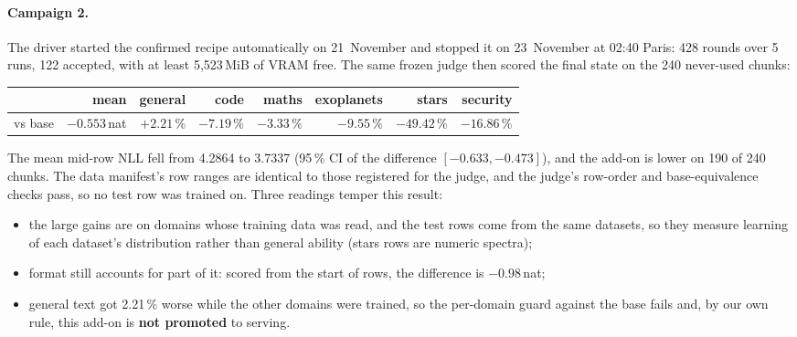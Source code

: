 \documentclass[11pt,a4paper]{article}
\begin{document}
\paragraph{Campaign 2.} The driver started the confirmed recipe automatically on 21~November and stopped it on
23~November at 02:40 Paris: 428 rounds over 5 runs, 122 accepted, with at least 5{,}523\,MiB of VRAM free. The same
frozen judge then scored the final state on the 240 never-used chunks:
\begin{center}\small
\begin{tabular}{@{}lrrrrrrr@{}}
\toprule
 & mean & general & code & maths & exoplanets & stars & security\\
\midrule
vs base & $-0.553$\,nat & $+2.21\,\%$ & $-7.19\,\%$ & $-3.33\,\%$ & $-9.55\,\%$ & $-49.42\,\%$ & $-16.86\,\%$\\
\bottomrule
\end{tabular}
\end{center}
The mean mid-row NLL fell from 4.2864 to 3.7337 (95\,\% CI of the difference $[-0.633,-0.473]$), and the add-on is
lower on 190 of 240 chunks. The data manifest's row ranges are identical to those registered for the judge, and the
judge's row-order and base-equivalence checks pass, so no test row was trained on. Three readings temper this result:
\begin{itemize}[leftmargin=*,itemsep=2pt]
  \item the large gains are on domains whose training data was read, and the test rows come from the same datasets,
    so they measure learning of each dataset's distribution rather than general ability (stars rows are numeric spectra);
  \item format still accounts for part of it: scored from the start of rows, the difference is $-0.98$\,nat;
  \item general text got 2.21\,\% worse while the other domains were trained, so the per-domain guard against the base
    fails and, by our own rule, this add-on is \textbf{not promoted} to serving.
\end{itemize}
\end{document}
